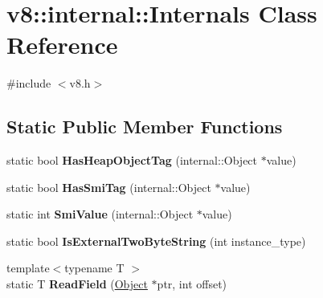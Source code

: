 \hypertarget{classv8_1_1internal_1_1_internals}{}\section{v8\+:\+:internal\+:\+:Internals Class Reference}
\label{classv8_1_1internal_1_1_internals}


{\ttfamily \#include $<$v8.\+h$>$}

\subsection*{Static Public Member Functions}
\begin{DoxyCompactItemize}
\item 
\hypertarget{classv8_1_1internal_1_1_internals_a2d3dc335df00b84e7e242e40012238ae}{}static bool {\bfseries Has\+Heap\+Object\+Tag} (internal\+::\+Object $\ast$value)\label{classv8_1_1internal_1_1_internals_a2d3dc335df00b84e7e242e40012238ae}

\item 
\hypertarget{classv8_1_1internal_1_1_internals_a6163342aeb37f207d618d9fb5d646a04}{}static bool {\bfseries Has\+Smi\+Tag} (internal\+::\+Object $\ast$value)\label{classv8_1_1internal_1_1_internals_a6163342aeb37f207d618d9fb5d646a04}

\item 
\hypertarget{classv8_1_1internal_1_1_internals_a9a26879dad8b7fdd38ebbeaad162b96c}{}static int {\bfseries Smi\+Value} (internal\+::\+Object $\ast$value)\label{classv8_1_1internal_1_1_internals_a9a26879dad8b7fdd38ebbeaad162b96c}

\item 
\hypertarget{classv8_1_1internal_1_1_internals_a072f010fdf69ea2c0d7145190221410f}{}static bool {\bfseries Is\+External\+Two\+Byte\+String} (int instance\+\_\+type)\label{classv8_1_1internal_1_1_internals_a072f010fdf69ea2c0d7145190221410f}

\item 
\hypertarget{classv8_1_1internal_1_1_internals_a457c0c73d5fdf4cc577133edce0ce37b}{}{\footnotesize template$<$typename T $>$ }\\static T {\bfseries Read\+Field} (\hyperlink{classv8_1_1_object}{Object} $\ast$ptr, int offset)\label{classv8_1_1internal_1_1_internals_a457c0c73d5fdf4cc577133edce0ce37b}

\end{DoxyCompactItemize}
